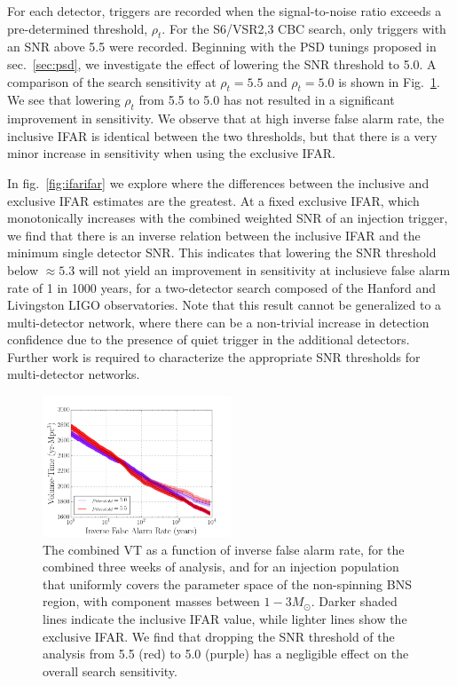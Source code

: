 For each detector, triggers are recorded when the signal-to-noise ratio exceeds a pre-determined threshold, $\rho_t$. For the S6/VSR2,3 CBC search, only triggers with an SNR above 5.5 were recorded. Beginning with the PSD tunings proposed in sec.~\ref{sec:psd}, we investigate the effect of lowering the SNR threshold to 5.0. A comparison of the search sensitivity at $\rho_t=5.5$ and $\rho_t=5.0$ is shown in Fig.~\ref{fig:snrthreshold}. We see that lowering $\rho_t$ from 5.5 to 5.0 has not resulted in a significant improvement in sensitivity. We observe that at high inverse false alarm rate, the inclusive IFAR is identical between the two thresholds, but that there is a very minor increase in sensitivity when using the exclusive IFAR.

In fig.~\ref{fig:ifarifar} we explore where the differences between the inclusive and exclusive IFAR estimates are the greatest. At a fixed exclusive IFAR, which monotonically increases with the combined weighted SNR of an injection trigger, we find that there is an inverse relation between the inclusive IFAR and the minimum single detector SNR. This indicates that lowering the SNR threshold below $\approx 5.3$ will not yield an improvement in sensitivity at inclusieve false alarm rate of 1 in 1000 years, for a two-detector search composed of the Hanford and Livingston LIGO observatories. Note that this result cannot be generalized to a multi-detector network, where there can be a non-trivial increase in detection confidence due to the presence of quiet trigger in the additional detectors. Further work is required to characterize the appropriate SNR thresholds for multi-detector networks.



\begin{figure}
\centering
\includegraphics[width=0.5\textwidth]{papers/bns_o1_dev/figures/snr_combined.png}
\caption{\label{fig:snrthreshold} 
The combined VT as a function of inverse false alarm rate, for the combined three weeks of analysis, and for an injection population that uniformly covers the parameter space of the non-spinning BNS region, with component masses between $1- 3M_\odot$. Darker shaded lines indicate the inclusive IFAR value, while lighter lines show the exclusive IFAR. We find that dropping the SNR threshold of the analysis from 5.5 (red) to 5.0 (purple) has a negligible effect on the overall search sensitivity.
}
\end{figure}


